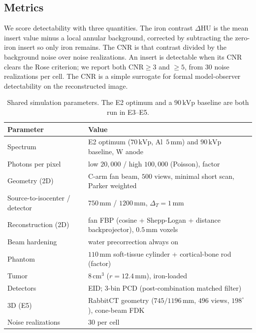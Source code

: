 \documentclass[]{spie}  %
\begin{document}
\subsection{Metrics}
\label{sec:metrics}
We score detectability with three quantities. The iron contrast $\Delta$HU is the
mean insert value minus a local annular background, corrected by subtracting the
zero-iron insert so only iron remains. The CNR is that contrast divided by the
background noise over noise realizations. An insert is detectable when its CNR clears
the Rose criterion\cite{Rose,Tapiovaara1985}; we report both $\mathrm{CNR}\ge3$ and
$\ge5$, from $30$ noise realizations per cell. The CNR is a simple surrogate for
formal model-observer detectability on the reconstructed image\cite{Wunderlich2008}.

\begin{table}[ht]
\caption{Shared simulation parameters. The E2 optimum and a $90\,\mathrm{kVp}$
baseline are both run in E3--E5.}
\label{tab:params}
\begin{center}
\begin{tabular}{ll}
\toprule
Parameter & Value \\
\midrule
Spectrum & E2 optimum ($70\,\mathrm{kVp}$, Al~$5\,\mathrm{mm}$) and
$90\,\mathrm{kVp}$ baseline, W anode \\
Photons per pixel & low $20{,}000$ / high $100{,}000$ (Poisson), factor \\
Geometry (2D) & C-arm fan beam, $500$ views, minimal short scan, Parker weighted \\
Source-to-isocenter / detector & $750\,\mathrm{mm}$ / $1200\,\mathrm{mm}$,
$\Delta_T=1\,\mathrm{mm}$ \\
Reconstruction (2D) & fan FBP (cosine + Shepp-Logan + distance backprojector),
$0.5\,\mathrm{mm}$ voxels \\
Beam hardening & water precorrection always on \\
Phantom & $110\,\mathrm{mm}$ soft-tissue cylinder + cortical-bone rod (factor) \\
Tumor & $8\,\mathrm{cm}^3$ ($r=12.4\,\mathrm{mm}$), iron-loaded \\
Detectors & EID; 3-bin PCD (post-combination matched filter) \\
3D (E5) & RabbitCT geometry ($745/1196\,\mathrm{mm}$, $496$ views, $198^\circ$),
cone-beam FDK \\
Noise realizations & $30$ per cell \\
\bottomrule
\end{tabular}
\end{center}
\end{table}
\end{document}
